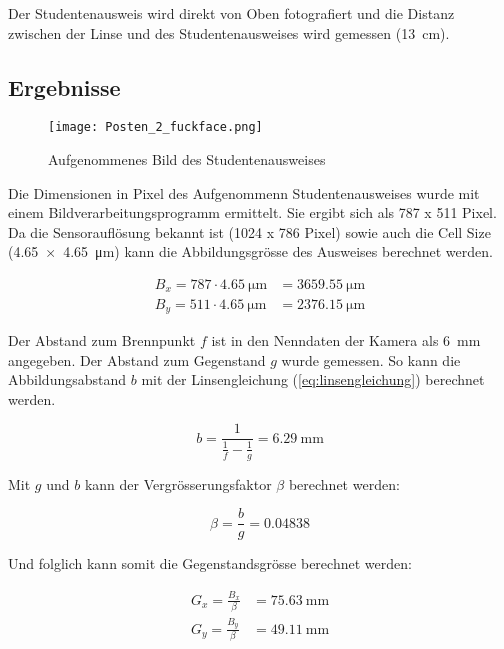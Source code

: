 Der  Studentenausweis  wird  direkt  von  Oben  fotografiert  und die  Distanz
zwischen   der   Linse    und    des    Studentenausweises    wird    gemessen
(\SI{13}{\centi\meter}).


\subsection{Ergebnisse}

\begin{figure}[h!]
    \centering
    \texttt{[image: Posten\_2\_fuckface.png]}
    \caption{Aufgenommenes Bild des Studentenausweises}
\end{figure}

Die Dimensionen  in  Pixel des Aufgenommenn Studentenausweises wurde mit einem
Bildverarbeitungsprogramm ermittelt. Sie ergibt sich als 787 x  511  Pixel. Da
die  Sensoraufl\"osung bekannt ist (1024 x 786 Pixel) sowie auch die Cell Size
(\SI{4.65  x  4.65}{\micro\meter})  kann  die Abbildungsgr\"osse des Ausweises
berechnet werden.

\begin{align*}
    B_x = 787\cdot\SI{4.65}{\micro\meter} &= \SI{3659.55}{\micro\meter} \\
    B_y = 511\cdot\SI{4.65}{\micro\meter} &= \SI{2376.15}{\micro\meter}
\end{align*}

Der  Abstand  zum  Brennpunkt  $f$  ist  in   den  Nenndaten  der  Kamera  als
\SI{6}{\milli\meter} angegeben. Der Abstand zum Gegenstand $g$ wurde gemessen.
So    kann    die    Abbildungsabstand    $b$    mit    der    Linsengleichung
(\ref{eq:linsengleichung}) berechnet werden.

\begin{equation*}
    b = \frac{1}{\frac{1}{f}-\frac{1}{g}} = \SI{6.29}{\milli\meter}
\end{equation*}

Mit $g$ und $b$ kann der Vergr\"osserungsfaktor $\beta$ berechnet werden:

\begin{equation*}
    \beta = \frac{b}{g} = 0.04838
\end{equation*}

Und folglich kann somit die Gegenstandsgr\"osse berechnet werden:

\begin{align*}
    G_x = \frac{B_x}{\beta} &= \SI{75.63}{\milli\meter} \\
    G_y = \frac{B_y}{\beta} &= \SI{49.11}{\milli\meter}
\end{align*}


